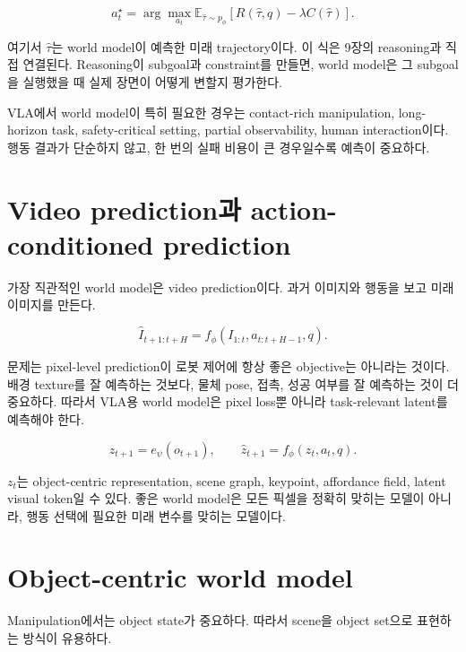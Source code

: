 \begin{equation}
  a_t^\star
  =
  \arg\max_{a_t}
  \mathbb{E}_{\hat{\tau}\sim p_\phi}
  \left[
    R(\hat{\tau},q)
    -
    \lambda C(\hat{\tau})
  \right].
\end{equation}

여기서 $\hat{\tau}$는 world model이 예측한 미래 trajectory이다. 이 식은 9장의 reasoning과 직접 연결된다. Reasoning이 subgoal과 constraint를 만들면, world model은 그 subgoal을 실행했을 때 실제 장면이 어떻게 변할지 평가한다.

VLA에서 world model이 특히 필요한 경우는 contact-rich manipulation, long-horizon task, safety-critical setting, partial observability, human interaction이다. 행동 결과가 단순하지 않고, 한 번의 실패 비용이 큰 경우일수록 예측이 중요하다.

\section{Video prediction과 action-conditioned prediction}

가장 직관적인 world model은 video prediction이다. 과거 이미지와 행동을 보고 미래 이미지를 만든다.

\begin{equation}
  \hat{I}_{t+1:t+H}
  =
  f_\phi(I_{1:t},a_{t:t+H-1},q).
\end{equation}

문제는 pixel-level prediction이 로봇 제어에 항상 좋은 objective는 아니라는 것이다. 배경 texture를 잘 예측하는 것보다, 물체 pose, 접촉, 성공 여부를 잘 예측하는 것이 더 중요하다. 따라서 VLA용 world model은 pixel loss뿐 아니라 task-relevant latent를 예측해야 한다.

\begin{equation}
  z_{t+1}
  =
  e_\psi(o_{t+1}),
  \qquad
  \hat{z}_{t+1}
  =
  f_\phi(z_t,a_t,q).
\end{equation}

$z_t$는 object-centric representation, scene graph, keypoint, affordance field, latent visual token일 수 있다. 좋은 world model은 모든 픽셀을 정확히 맞히는 모델이 아니라, 행동 선택에 필요한 미래 변수를 맞히는 모델이다.

\section{Object-centric world model}

Manipulation에서는 object state가 중요하다. 따라서 scene을 object set으로 표현하는 방식이 유용하다.

